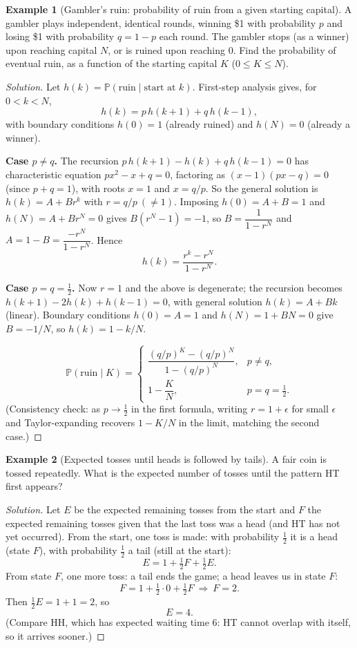 \documentclass[11pt]{article}
\theoremstyle{definition}
\newtheorem{example}{Example}[section]
\begin{document}
\begin{example}[Gambler's ruin: probability of ruin from a given starting capital]
A gambler plays independent, identical rounds, winning \$1 with probability $p$ and losing \$1 with probability $q=1-p$ each round. The gambler stops (as a winner) upon reaching capital $N$, or is ruined upon reaching $0$. Find the probability of eventual ruin, as a function of the starting capital $K$ ($0\le K\le N$).
\end{example}
\begin{proof}[Solution]
Let $h(k)=\mathbb P(\text{ruin}\mid\text{start at }k)$. First-step analysis gives, for $0<k<N$,
\[
h(k)=p\,h(k+1)+q\,h(k-1),
\]
with boundary conditions $h(0)=1$ (already ruined) and $h(N)=0$ (already a winner).

\textbf{Case $p\ne q$.} The recursion $p\,h(k+1)-h(k)+q\,h(k-1)=0$ has characteristic equation $p x^2-x+q=0$, factoring as $(x-1)(px-q)=0$ (since $p+q=1$), with roots $x=1$ and $x=q/p$. So the general solution is $h(k)=A+Br^k$ with $r=q/p\ (\ne1)$. Imposing $h(0)=A+B=1$ and $h(N)=A+Br^N=0$ gives $B(r^N-1)=-1$, so $B=\dfrac1{1-r^N}$ and $A=1-B=\dfrac{-r^N}{1-r^N}$. Hence
\[
h(k)=\frac{r^k-r^N}{1-r^N}.
\]

\textbf{Case $p=q=\tfrac12$.} Now $r=1$ and the above is degenerate; the recursion becomes $h(k+1)-2h(k)+h(k-1)=0$, with general solution $h(k)=A+Bk$ (linear). Boundary conditions $h(0)=A=1$ and $h(N)=1+BN=0$ give $B=-1/N$, so $h(k)=1-k/N$.

\[
\boxed{\mathbb P(\text{ruin}\mid K)=\begin{cases}\dfrac{(q/p)^K-(q/p)^N}{1-(q/p)^N}, & p\ne q,\\[10pt] 1-\dfrac KN, & p=q=\tfrac12.\end{cases}}
\]
(Consistency check: as $p\to\tfrac12$ in the first formula, writing $r=1+\epsilon$ for small $\epsilon$ and Taylor-expanding recovers $1-K/N$ in the limit, matching the second case.)
\end{proof}

\begin{example}[Expected tosses until heads is followed by tails]
A fair coin is tossed repeatedly. What is the expected number of tosses until the pattern HT first appears?
\end{example}

\begin{proof}[Solution]
Let $E$ be the expected remaining tosses from the start and $F$ the expected remaining tosses given that the last toss was a head (and HT has not yet occurred). From the start, one toss is made: with probability $\tfrac12$ it is a head (state $F$), with probability $\tfrac12$ a tail (still at the start):
\[
E=1+\tfrac12F+\tfrac12E.
\]
From state $F$, one more toss: a tail ends the game; a head leaves us in state $F$:
\[
F=1+\tfrac12\cdot0+\tfrac12F\ \Longrightarrow\ F=2.
\]
Then $\tfrac12E=1+1=2$, so
\[
\boxed{E=4}.
\]
(Compare HH, which has expected waiting time $6$: HT cannot overlap with itself, so it arrives sooner.)
\end{proof}
\end{document}
